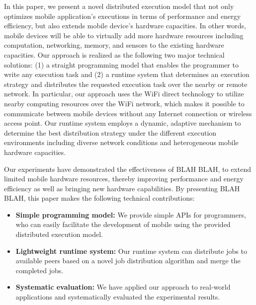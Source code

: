 \documentclass[conference]{IEEEtran}
\begin{document}
In this paper, we present a novel distributed execution model that not only optimizes mobile application's executions in terms of performance and energy efficiency, but also extends mobile device's hardware capacities. In other words, mobile devices will be able to virtually add more hardware resources including computation, networking, memory, and sensors to the existing hardware capacities. Our approach is realized as the following two major technical solutions: (1) a straight programming model that enables the programmer to write any execution task and (2) a runtime system that determines an execution strategy and distributes the requested execution task over the nearby or remote network. In particular, our approach uses the WiFi direct technology \cite{} to utilize nearby computing resources over the WiFi network, which makes it possible to communicate between mobile devices without any Internet connection or wireless access point. Our runtime system employs a dynamic, adaptive mechanism to determine the best distribution strategy under the different execution environments including diverse network conditions and heterogeneous mobile hardware capacities.

Our experiments have demonstrated the effectiveness of BLAH BLAH, to extend limited mobile hardware resources, thereby improving performance and energy efficiency as well as bringing new hardware capabilities. By presenting BLAH BLAH, this paper makes the following technical contributions:
\begin{itemize}
	\item \textbf{Simple programming model:} We provide simple APIs for programmers, who can easily facilitate the development of mobile using the provided distributed execution model.
	\item \textbf{Lightweight runtime system:} Our runtime system can distribute jobs to available peers based on a novel job distribution algorithm and merge the completed jobs. 	
	\item \textbf{Systematic evaluation:} We have applied our approach to real-world applications and systematically evaluated the experimental results.
\end{itemize}

\end{document}

